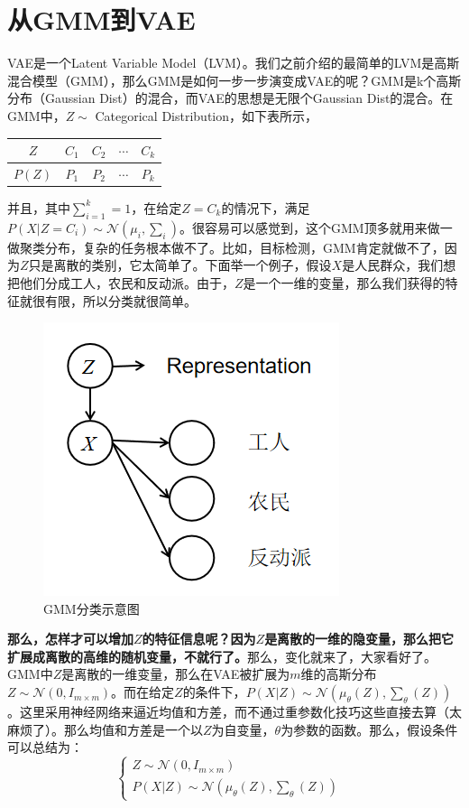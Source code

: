 \documentclass[a4paper]{article}
\begin{document}
\section{从GMM到VAE}
VAE是一个Latent Variable Model（LVM）。我们之前介绍的最简单的LVM是高斯混合模型（GMM），那么GMM是如何一步一步演变成VAE的呢？GMM是k个高斯分布（Gaussian Dist）的混合，而VAE的思想是无限个Gaussian Dist的混合。在GMM中，$Z\sim$ Categorical Distribution，如下表所示，
\begin{table}[H]
    \centering
    \begin{tabular}{c|cccc}
         $Z$ & $C_1$ & $C_2$ & $\cdots$ & $C_k$  \\
         \hline
         $P(Z)$ & $P_1$ & $P_2$ & $\cdots$ & $P_k$  \\
    \end{tabular}
\end{table}
并且，其中$\sum_{i=1}^k = 1$，在给定$Z=C_k$的情况下，满足$P(X|Z=C_i)\sim \mathcal{N}(\mu_i, \sum_i)$。很容易可以感觉到，这个GMM顶多就用来做一做聚类分布，复杂的任务根本做不了。比如，目标检测，GMM肯定就做不了，因为$Z$只是离散的类别，它太简单了。下面举一个例子，假设$X$是人民群众，我们想把他们分成工人，农民和反动派。由于，$Z$是一个一维的变量，那么我们获得的特征就很有限，所以分类就很简单。
\begin{figure}[H]
    \centering
    \includegraphics[width=.35\textwidth]{微信图片_20200627152457.png}
    \caption{GMM分类示意图}
    \label{fig:my_label_1}
\end{figure}
\textbf{那么，怎样才可以增加$Z$的特征信息呢？因为$Z$是离散的一维的隐变量，那么把它扩展成离散的高维的随机变量，不就行了。}那么，变化就来了，大家看好了。GMM中$Z$是离散的一维变量，那么在VAE被扩展为$m$维的高斯分布$Z\sim \mathcal{N}(0,I_{m\times m})$。而在给定$Z$的条件下，$P(X|Z)\sim \mathcal{N}(\mu_{\theta}(Z),\sum_{\theta}(Z))$。这里采用神经网络来逼近均值和方差，而不通过重参数化技巧这些直接去算（太麻烦了）。那么均值和方差是一个以$Z$为自变量，$\theta$为参数的函数。那么，假设条件可以总结为：
\begin{equation}
    \left\{
    \begin{array}{ll}
        Z\sim \mathcal{N}(0,I_{m\times m}) &  \\
        P(X|Z)\sim \mathcal{N}(\mu_{\theta}(Z),\sum_{\theta}(Z)) & 
    \end{array}
    \right.
\end{equation}
\end{document}
